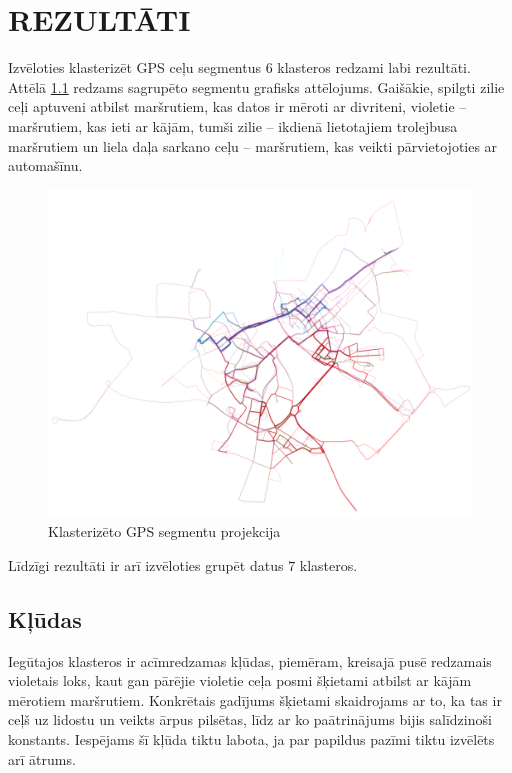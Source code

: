 \documentclass{ludis}
\begin{document}
\chapter{REZULTĀTI}
Izvēloties klasterizēt GPS ceļu segmentus $6$ klasteros redzami labi rezultāti. Attēlā 
\ref{fig:clustered_trails} \linebreak redzams sagrupēto segmentu grafisks attēlojums. Gaišākie, 
spilgti zilie ceļi aptuveni atbilst maršrutiem, kas datos ir mēroti ar divriteni, violetie -- 
maršrutiem, kas ieti ar kājām, tumši zilie -- ikdienā lietotajiem trolejbusa maršrutiem un liela daļa
sarkano ceļu -- maršrutiem, kas veikti pārvietojoties ar automašīnu.

\begin{figure}
  \centering
  \includegraphics[scale=0.45]{img/clustered_trails}
  \caption{Klasterizēto GPS segmentu projekcija}
  \label{fig:clustered_trails}
\end{figure}

Līdzīgi rezultāti ir arī izvēloties grupēt datus $7$ klasteros.

\section{Kļūdas}
Iegūtajos klasteros ir acīmredzamas kļūdas, piemēram, kreisajā pusē redzamais violetais loks, kaut
gan pārējie violetie ceļa posmi šķietami atbilst ar kājām mērotiem maršrutiem. Konkrētais gadījums
šķietami skaidrojams ar to, ka tas ir ceļš uz lidostu un veikts ārpus pilsētas, līdz ar ko
paātrinājums bijis salīdzinoši konstants. Iespējams šī kļūda tiktu labota, ja 
par \linebreak papildus pazīmi tiktu izvēlēts arī ātrums.
\end{document}
